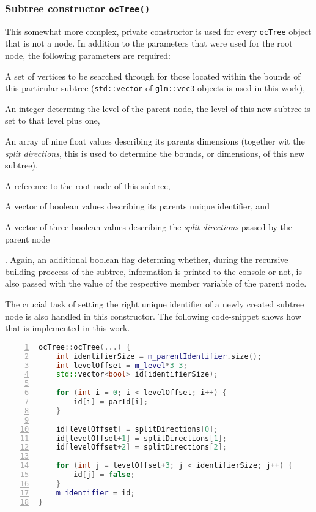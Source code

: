 \subsubsection{Subtree constructor \texttt{ocTree()}}
\label{sec:subtree_constructor}
	This somewhat more complex, private constructor is used for every \texttt{ocTree} object that is not a node. In addition to the parameters that were used for the root node, the following parameters are required:
	\begin{enumerate*}
		\item A set of vertices to be searched through for those located within the bounds of this particular subtree (\texttt{std::vector} of \texttt{glm::vec3} objects is used in this work), 
		\item An integer determing the level of the parent node, the level of this new subtree is set to that level plus one,
		\item An array of nine float values describing its parents dimensions (together wit the \textit{split directions}, this is used to determine the bounds, or dimensions, of this new subtree),
		\item A reference to the root node of this subtree,
		\item A vector of boolean values describing its parents unique identifier, and
		\item A vector of three boolean values describing the \textit{split directions} passed by the parent node
	\end{enumerate*}.
	Again, an additional boolean flag determing whether, during the recursive building proccess of the subtree, information is printed to the console or not, is also passed with the value of the respective member variable of the parent node.

The crucial task of setting the right unique identifier of a newly created subtree node is also handled in this constructor. The following code-snippet shows how that is implemented in this work.

\begin{minipage}{\linewidth}
\begin{lstlisting}[language=C++,numberstyle=\zebra{black!5}{white}{},numbers=left,xleftmargin=2em,tabsize=3]
ocTree::ocTree(...) {
	int identifierSize = m_parentIdentifier.size();
	int levelOffset = m_level*3-3;
	std::vector<bool> id(identifierSize);

	for (int i = 0; i < levelOffset; i++) {
		id[i] = parId[i];
	}

	id[levelOffset] = splitDirections[0];
	id[levelOffset+1] = splitDirections[1];
	id[levelOffset+2] = splitDirections[2];

	for (int j = levelOffset+3; j < identifierSize; j++) {
		id[j] = false;
	}
	m_identifier = id;
}
\end{lstlisting}
\end{minipage}

